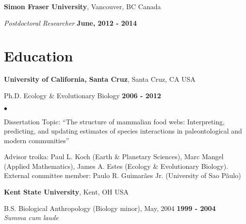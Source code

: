 \documentclass[margin,line,12pt]{res}
\newenvironment{list1}{
  \begin{list}{\ding{113}}{%
      \setlength{\itemsep}{0in}
      \setlength{\parsep}{0in} \setlength{\parskip}{0in}
      \setlength{\topsep}{0in} \setlength{\partopsep}{0in}
      \setlength{\leftmargin}{0.17in}}}{\end{list}}
\newenvironment{list2}{
  \begin{list}{$\bullet$}{%
      \setlength{\itemsep}{0in}
      \setlength{\parsep}{0in} \setlength{\parskip}{0in}
      \setlength{\topsep}{0in} \setlength{\partopsep}{0in}
      \setlength{\leftmargin}{0.2in}}}{\end{list}}
\begin{document}
\begin{resume}
{\bf Simon Fraser University}, Vancouver, BC Canada

\vspace{-.3cm}
{\em Postdoctoral Researcher} \hfill {\bf June, 2012 - 2014}\\


\section{\sc Education}
{\bf University of California, Santa Cruz}, Santa Cruz, CA USA\\
\vspace*{-.1in}
\begin{list1}
\item[] Ph.D. Ecology \& Evolutionary Biology \hfill {\bf 2006 - 2012}\\
\begin{list2}
\vspace*{-.08in}
\item Dissertation Topic: ``The structure of mammalian food webs: Interpreting, predicting, and updating estimates of species interactions in paleontological and modern communities''
\item Advisor troika: Paul L. Koch (Earth \& Planetary Sciences), Marc Mangel (Applied Mathematics), James A. Estes (Ecology \& Evolutionary Biology).\\ External committee member: Paulo R. Guimar\~aes Jr. (University of Sao P\~aulo)
\end{list2}
\end{list1}


{\bf Kent State University}, Kent, OH USA\\
\vspace*{-.1in}
\begin{list1}
\item[] B.S. Biological Anthropology (Biology minor),  May, 2004 \hfill {\bf 1999 - 2004} \\
\emph{Summa cum laude}
\end{list1}




\end{resume}
\end{document}
